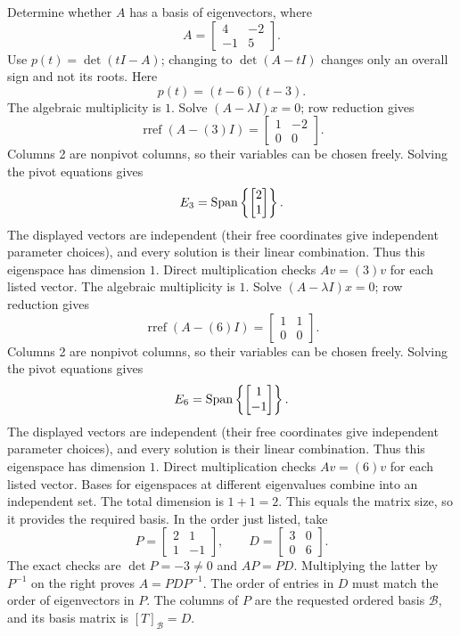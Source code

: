 \goal Determine whether $A$ has a basis of eigenvectors, where
\[A=\begin{bmatrix}4&-2\\-1&5\end{bmatrix}.\]
Use $p(t)=\det(tI-A)$; changing to $\det(A-tI)$ changes only an overall sign and not its roots. Here
\[p(t)=\left(t - 6\right) \left(t - 3\right).\]
The algebraic multiplicity is $1$. Solve $(A-\lambda I)x=0$; row reduction gives
\[\operatorname{rref}(A-(3)I)=\begin{bmatrix}1&-2\\0&0\end{bmatrix}.\]
Columns 2 are nonpivot columns, so their variables can be chosen freely. Solving the pivot equations gives
\[E_{3}=\operatorname{Span}\left\{\begin{bmatrix}2\\1\end{bmatrix}\right\}.\]
The displayed vectors are independent (their free coordinates give independent parameter choices), and every solution is their linear combination. Thus this eigenspace has dimension $1$. Direct multiplication checks $Av=(3)v$ for each listed vector.
The algebraic multiplicity is $1$. Solve $(A-\lambda I)x=0$; row reduction gives
\[\operatorname{rref}(A-(6)I)=\begin{bmatrix}1&1\\0&0\end{bmatrix}.\]
Columns 2 are nonpivot columns, so their variables can be chosen freely. Solving the pivot equations gives
\[E_{6}=\operatorname{Span}\left\{\begin{bmatrix}1\\-1\end{bmatrix}\right\}.\]
The displayed vectors are independent (their free coordinates give independent parameter choices), and every solution is their linear combination. Thus this eigenspace has dimension $1$. Direct multiplication checks $Av=(6)v$ for each listed vector.
Bases for eigenspaces at different eigenvalues combine into an independent set. The total dimension is $1+1=2$.
This equals the matrix size, so it provides the required basis. In the order just listed, take
\[P=\begin{bmatrix}2&1\\1&-1\end{bmatrix},\qquad D=\begin{bmatrix}3&0\\0&6\end{bmatrix}.\]
The exact checks are $\det P=-3\ne0$ and $AP=PD$. Multiplying the latter by $P^{-1}$ on the right proves $A=PDP^{-1}$. The order of entries in $D$ must match the order of eigenvectors in $P$.
The columns of $P$ are the requested ordered basis $\mathcal B$, and its basis matrix is $[T]_{\mathcal B}=D$.

